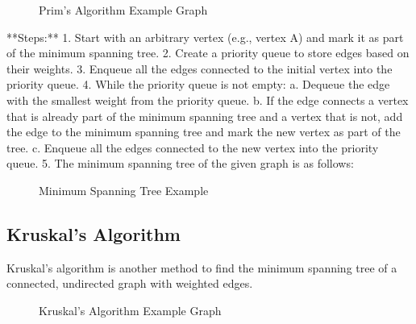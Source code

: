 \documentclass{article}
\begin{document}
\begin{figure}[h]
    \centering
    \caption{Prim's Algorithm Example Graph}
\end{figure}

**Steps:**
1. Start with an arbitrary vertex (e.g., vertex A) and mark it as part of the minimum spanning tree.
2. Create a priority queue to store edges based on their weights.
3. Enqueue all the edges connected to the initial vertex into the priority queue.
4. While the priority queue is not empty:
   a. Dequeue the edge with the smallest weight from the priority queue.
   b. If the edge connects a vertex that is already part of the minimum spanning tree and a vertex that is not, add the edge to the minimum spanning tree and mark the new vertex as part of the tree.
   c. Enqueue all the edges connected to the new vertex into the priority queue.
5. The minimum spanning tree of the given graph is as follows:

\begin{figure}[h]
    \centering
    \caption{Minimum Spanning Tree Example}
\end{figure}

\subsection{Kruskal's Algorithm}
Kruskal's algorithm is another method to find the minimum spanning tree of a connected, undirected graph with weighted edges.

\begin{figure}[h]
    \centering
    \caption{Kruskal's Algorithm Example Graph}
\end{figure}
\end{document}
